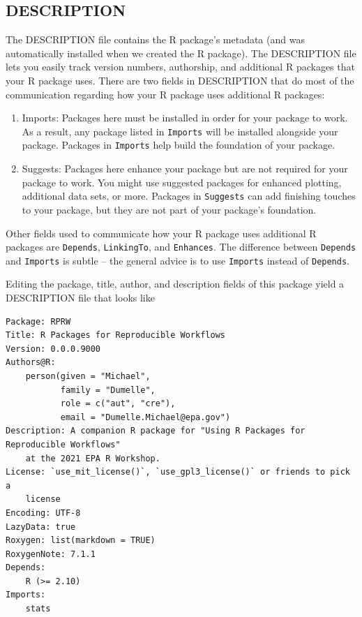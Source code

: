 \documentclass[
]{book}
\begin{document}
\hypertarget{description}{%
\subsection{DESCRIPTION}\label{description}}

The DESCRIPTION file contains the R package's metadata (and was automatically installed when we created the R package). The DESCRIPTION file lets you easily track version numbers, authorship, and additional R packages that your R package uses. There are two fields in DESCRIPTION that do most of the communication regarding how your R package uses additional R packages:

\begin{enumerate}
\def\labelenumi{\arabic{enumi}.}
\item
  Imports: Packages here must be installed in order for your package to work. As a result, any package listed in \texttt{Imports} will be installed alongside your package. Packages in \texttt{Imports} help build the foundation of your package.
\item
  Suggests: Packages here enhance your package but are not required for your package to work. You might use suggested packages for enhanced plotting, additional data sets, or more. Packages in \texttt{Suggests} can add finishing touches to your package, but they are not part of your package's foundation.
\end{enumerate}

Other fields used to communicate how your R package uses additional R packages are \texttt{Depends}, \texttt{LinkingTo}, and \texttt{Enhances}. The difference between \texttt{Depends} and \texttt{Imports} is subtle -- the general advice is to use \texttt{Imports} instead of \texttt{Depends}.

Editing the package, title, author, and description fields of this package yield a DESCRIPTION file that looks like

\begin{verbatim}
Package: RPRW
Title: R Packages for Reproducible Workflows
Version: 0.0.0.9000
Authors@R: 
    person(given = "Michael",
           family = "Dumelle",
           role = c("aut", "cre"),
           email = "Dumelle.Michael@epa.gov")
Description: A companion R package for "Using R Packages for Reproducible Workflows"
    at the 2021 EPA R Workshop.
License: `use_mit_license()`, `use_gpl3_license()` or friends to pick a
    license
Encoding: UTF-8
LazyData: true
Roxygen: list(markdown = TRUE)
RoxygenNote: 7.1.1
Depends: 
    R (>= 2.10)
Imports: 
    stats
\end{verbatim}
\end{document}
